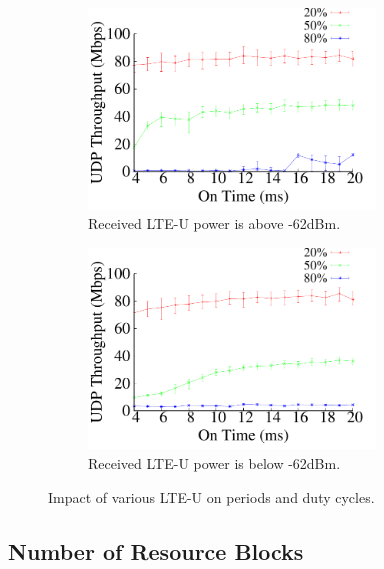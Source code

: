 \begin{figure}[t] \centering
    \begin{subfigure}[b]{\linewidth} \centering
     \includegraphics[width=3.0in, angle=0]{./figures/impact_ontime_tplink_above} 
         \vspace{-0.0cm}
         \caption{Received LTE-U power is above -62dBm.}         
        \label{impact_ontime:a}
    \end{subfigure} %

    \begin{subfigure}[b]{\linewidth} \centering 
     \includegraphics[width=3.0in, angle=0]{./figures/impact_ontime_tplink_below}  
        \vspace{-0.0cm}
        \caption{Received LTE-U power is below -62dBm.}
        \label{impact_ontime:b}    
    \end{subfigure} 
\caption{Impact of various LTE-U on periods and duty cycles.}
\label{impact_ontime}
\vspace{-0.2cm}
\end{figure}







\subsection{Number of Resource Blocks}


